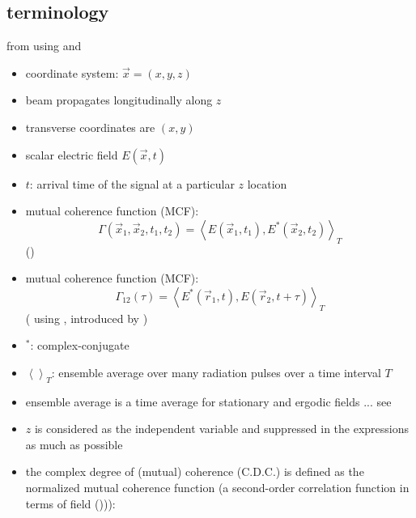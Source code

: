 \documentclass{article}
\begin{document}
\subsection{terminology}

from \cite{Huang:2013nka} using \cite{Goodman2015-StatisticalOptics2e} and \cite{SingerSorgenfreiMancusoEtAl2012}

\begin{itemize}
	\item coordinate system: $\vec{x} = (x,y,z) $
	\item beam propagates longitudinally along $ z $
	\item transverse coordinates are $ (x,y) $ 
	\item scalar electric field $ E(\vec{x}, t) $
	\item $ t $: arrival time of the signal at a particular $ z $ location
	\item mutual coherence function (MCF):
	\begin{equation}\label{key}
	\Gamma(\vec{x}_1,\vec{x}_2,t_1,t_2) = \left\langle E(\vec{x}_1, t_1), E^*(\vec{x}_2, t_2) \right\rangle_T
	\end{equation} (\cite[eq.?]{Huang:2013nka})
	\item mutual coherence function (MCF): 
	\begin{equation}\label{key}
	\Gamma_{12}(\tau) = \left\langle E^*(\vec{r}_1, t), E(\vec{r}_2, t+\tau) \right\rangle_T
	\end{equation} (\cite[eq.1]{SingerSorgenfreiMancusoEtAl2012} using \cite[eq.(5.2-8),p.175]{Goodman2015-StatisticalOptics2e}, \cite[eq.(4.3-9), p.163]{MandelWolf1995-Opticalcoherencequantum} introduced by \cite[eq.(1-2)]{Wolf1955})
	\item $ ^* $: complex-conjugate
	\item $ \left\langle \right\rangle_T $: ensemble average over many radiation pulses over a time interval $ T $
	\item ensemble average is a time average for stationary and ergodic fields ... see \cite[p.162]{MandelWolf1995-Opticalcoherencequantum}
	\item $ z $ is considered as the independent variable and suppressed in the expressions as much as possible
	\item the complex degree of (mutual) coherence (C.D.C.) is defined as the normalized mutual coherence function (a second-order correlation function in terms of field (\cite[eq.4]{BagschikFroemterMuellerEtAl2016a}))):
	\begin{equation}\label{key}

\end{equation}
\end{itemize}
\end{document}
